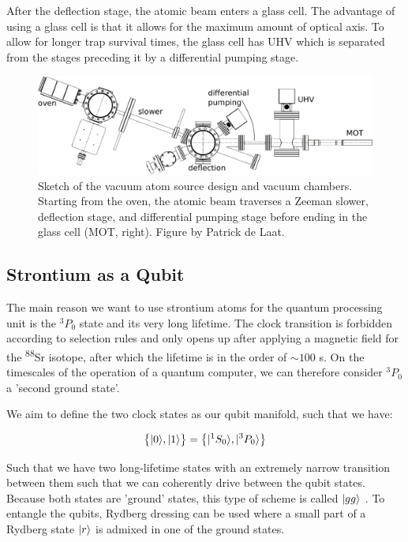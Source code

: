 After the deflection stage, the atomic beam enters a glass cell. The advantage of using a glass cell is that it allows for the maximum amount of optical axis. To allow for longer trap survival times, the glass cell has \ac{UHV} which is separated from the stages preceding it by a differential pumping stage. 

\begin{figure}
	\centering
	\includegraphics[width=0.9\linewidth]{figures/SrLoading.pdf}
	\caption{Sketch of the vacuum atom source design and vacuum chambers. Starting from the oven, the atomic beam traverses a Zeeman slower, deflection stage, and differential pumping stage before ending in the glass cell (MOT, right). Figure by Patrick de Laat.}
	\label{fig:SrLoading}
\end{figure}

\subsection{Strontium as a Qubit}\label{sec:QubitScheme}

The main reason we want to use strontium atoms for the quantum processing unit is the ${}^3P_0$ state and its very long lifetime. The clock transition is forbidden according to selection rules and only opens up after applying a magnetic field for the \textsuperscript{88}Sr isotope, after which the lifetime is in the order of $\sim 100$ s. On the timescales of the operation of a quantum computer, we can therefore consider ${}^3P_0$ a 'second ground state'. 

We aim to define the two clock states as our qubit manifold, such that we have:

\begin{equation}\label{eq:QubitManifold}
	\big\{\lvert0\rangle,\lvert1\rangle\big\} = 
	\left\{
		\lvert{}^1S_0\rangle, \lvert{}^3P_0\rangle 
	\right\}
\end{equation}

Such that we have two long-lifetime states with an extremely narrow transition between them such that we can coherently drive between the qubit states. Because both states are 'ground' states, this type of scheme is called $\lvert gg\rangle$ \cite{Wu2021}. To entangle the qubits, Rydberg dressing can be used \cite{Wu2021} where a small part of a Rydberg state $\lvert r\rangle$ is admixed in one of the ground states. 

